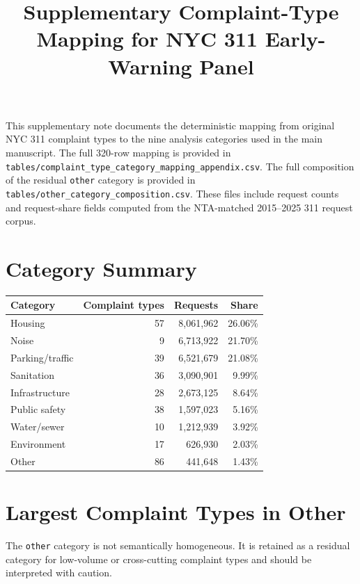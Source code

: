 \documentclass[10pt]{article}
\title{Supplementary Complaint-Type Mapping for NYC 311 Early-Warning Panel}
\author{}
\date{}
\begin{document}
\maketitle

This supplementary note documents the deterministic mapping from original NYC 311 complaint types to the nine analysis categories used in the main manuscript. The full 320-row mapping is provided in \texttt{tables/complaint\_type\_category\_mapping\_appendix.csv}. The full composition of the residual \texttt{other} category is provided in \texttt{tables/other\_category\_composition.csv}. These files include request counts and request-share fields computed from the NTA-matched 2015--2025 311 request corpus.

\section*{Category Summary}

\begin{table}[h]
\centering
\begin{tabular}{@{}lrrr@{}}
\toprule
Category & Complaint types & Requests & Share \\
\midrule
Housing & 57 & 8,061,962 & 26.06\% \\
Noise & 9 & 6,713,922 & 21.70\% \\
Parking/traffic & 39 & 6,521,679 & 21.08\% \\
Sanitation & 36 & 3,090,901 & 9.99\% \\
Infrastructure & 28 & 2,673,125 & 8.64\% \\
Public safety & 38 & 1,597,023 & 5.16\% \\
Water/sewer & 10 & 1,212,939 & 3.92\% \\
Environment & 17 & 626,930 & 2.03\% \\
Other & 86 & 441,648 & 1.43\% \\
\bottomrule
\end{tabular}
\end{table}

\section*{Largest Complaint Types in Other}

The \texttt{other} category is not semantically homogeneous. It is retained as a residual category for low-volume or cross-cutting complaint types and should be interpreted with caution.
\end{document}
